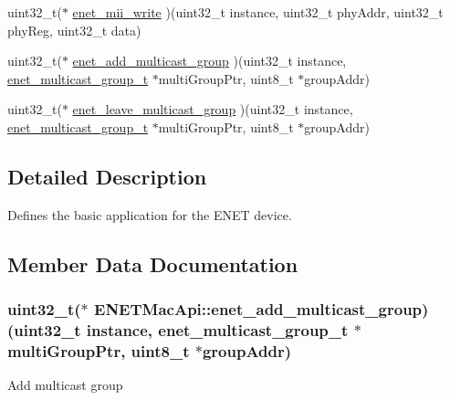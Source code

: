 \begin{DoxyCompactItemize}
\item 
uint32\+\_\+t($\ast$ \hyperlink{structENETMacApi_a33c4e5a8bd34bbb4dd2e8a8dd19808d5}{enet\+\_\+mii\+\_\+write} )(uint32\+\_\+t instance, uint32\+\_\+t phy\+Addr, uint32\+\_\+t phy\+Reg, uint32\+\_\+t data)
\item 
uint32\+\_\+t($\ast$ \hyperlink{structENETMacApi_a15ecd7128a3f6aedf887c222875f111a}{enet\+\_\+add\+\_\+multicast\+\_\+group} )(uint32\+\_\+t instance, \hyperlink{group__enet__driver_ga0f85fe28ec946c36acd9856e9f70799a}{enet\+\_\+multicast\+\_\+group\+\_\+t} $\ast$multi\+Group\+Ptr, uint8\+\_\+t $\ast$group\+Addr)
\item 
uint32\+\_\+t($\ast$ \hyperlink{structENETMacApi_a3f14ecb5e7c1ba8244d6f6f7c6569d02}{enet\+\_\+leave\+\_\+multicast\+\_\+group} )(uint32\+\_\+t instance, \hyperlink{group__enet__driver_ga0f85fe28ec946c36acd9856e9f70799a}{enet\+\_\+multicast\+\_\+group\+\_\+t} $\ast$multi\+Group\+Ptr, uint8\+\_\+t $\ast$group\+Addr)
\end{DoxyCompactItemize}


\subsection{Detailed Description}
Defines the basic application for the E\+N\+ET device. 

\subsection{Member Data Documentation}
\subsubsection[{\texorpdfstring{enet\+\_\+add\+\_\+multicast\+\_\+group}{enet_add_multicast_group}}]{\setlength{\rightskip}{0pt plus 5cm}uint32\+\_\+t($\ast$  E\+N\+E\+T\+Mac\+Api\+::enet\+\_\+add\+\_\+multicast\+\_\+group) (uint32\+\_\+t instance, {\bf enet\+\_\+multicast\+\_\+group\+\_\+t} $\ast$multi\+Group\+Ptr, uint8\+\_\+t $\ast$group\+Addr)}\hypertarget{structENETMacApi_a15ecd7128a3f6aedf887c222875f111a}{}\label{structENETMacApi_a15ecd7128a3f6aedf887c222875f111a}
Add multicast group 

